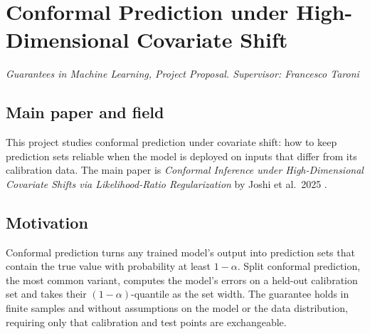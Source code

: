 \documentclass[10pt]{article}
\begin{document}
\setlength{\headheight}{8\baselineskip}
\setlength{\parindent}{0pt}
\setlength{\parskip}{\baselineskip}

\titlespacing*{\section}{0pt}{0.0ex}{0.0ex}
\titlespacing*{\subsection}{0pt}{0ex}{-1ex}

\section*{Conformal Prediction under High-Dimensional Covariate Shift}
\vspace{-1em}
{\itshape Guarantees in Machine Learning, Project Proposal. Supervisor: Francesco Taroni}

\subsection*{Main paper and field}

\vspace{-0.25em}

This project studies conformal prediction under covariate shift: how to keep prediction
sets reliable when the model is deployed on inputs that differ from its calibration data.
The main paper is \textit{Conformal Inference under High-Dimensional Covariate Shifts via
Likelihood-Ratio Regularization} by Joshi et al.\ 2025 \cite{joshi2026conformal}.

\subsection*{Motivation}

\vspace{-0.25em}

Conformal prediction turns any trained model's output into prediction sets that contain
the true value with probability at least $1{-}\alpha$. Split conformal prediction, the
most common variant, computes the model's errors on a held-out calibration set and takes
their $(1{-}\alpha)$-quantile as the set width. The guarantee holds in finite samples and
without assumptions on the model or the data distribution, requiring only that calibration
and test points are exchangeable.

\vspace{-0.25em}
\end{document}
